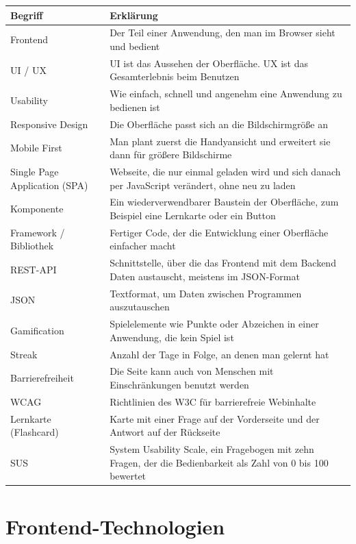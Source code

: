 \begin{center}
\begin{tabular}{|p{4.2cm}|p{9.3cm}|}
\hline
\textbf{Begriff} & \textbf{Erklärung} \\
\hline
Frontend & Der Teil einer Anwendung, den man im Browser sieht und bedient \\
\hline
UI / UX & UI ist das Aussehen der Oberfläche. UX ist das Gesamterlebnis beim Benutzen \\
\hline
Usability & Wie einfach, schnell und angenehm eine Anwendung zu bedienen ist \\
\hline
Responsive Design & Die Oberfläche passt sich an die Bildschirmgröße an \\
\hline
Mobile First & Man plant zuerst die Handyansicht und erweitert sie dann für größere Bildschirme \\
\hline
Single Page Application (SPA) & Webseite, die nur einmal geladen wird und sich danach per JavaScript verändert, ohne neu zu laden \\
\hline
Komponente & Ein wiederverwendbarer Baustein der Oberfläche, zum Beispiel eine Lernkarte oder ein Button \\
\hline
Framework / Bibliothek & Fertiger Code, der die Entwicklung einer Oberfläche einfacher macht \\
\hline
REST-API & Schnittstelle, über die das Frontend mit dem Backend Daten austauscht, meistens im JSON-Format \\
\hline
JSON & Textformat, um Daten zwischen Programmen auszutauschen \\
\hline
Gamification & Spielelemente wie Punkte oder Abzeichen in einer Anwendung, die kein Spiel ist \\
\hline
Streak & Anzahl der Tage in Folge, an denen man gelernt hat \\
\hline
Barrierefreiheit & Die Seite kann auch von Menschen mit Einschränkungen benutzt werden \\
\hline
WCAG & Richtlinien des W3C für barrierefreie Webinhalte \\
\hline
Lernkarte (Flashcard) & Karte mit einer Frage auf der Vorderseite und der Antwort auf der Rückseite \\
\hline
SUS & System Usability Scale, ein Fragebogen mit zehn Fragen, der die Bedienbarkeit als Zahl von 0 bis 100 bewertet \\
\hline
\end{tabular}
\end{center}
 
 
\section{Frontend-Technologien}
 
